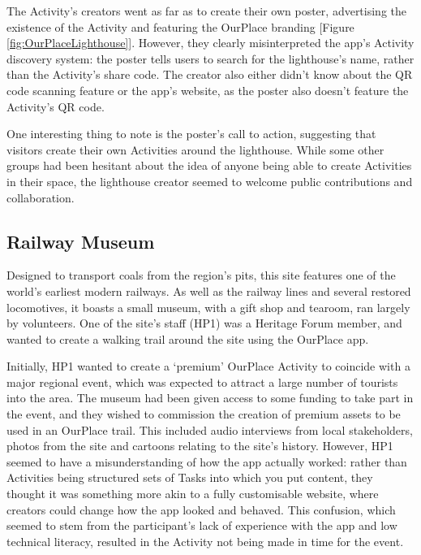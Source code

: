 The Activity's creators went as far as to create their own poster, advertising the existence of the Activity and featuring the OurPlace branding [Figure \ref{fig:OurPlaceLighthouse}]. However, they clearly misinterpreted the app's Activity discovery system: the poster tells users to search for the lighthouse's name, rather than the Activity's share code. The creator also either didn't know about the QR code scanning feature or the app's website, as the poster also doesn't feature the Activity's QR code. 

One interesting thing to note is the poster's call to action, suggesting that visitors create their own Activities around the lighthouse. While some other groups had been hesitant about the idea of anyone being able to create Activities in their space, the lighthouse creator seemed to welcome public contributions and collaboration.

\subsection{Railway Museum}

Designed to transport coals from the region's pits, this site features one of the world's earliest modern railways. As well as the railway lines and several restored locomotives, it boasts a small museum, with a gift shop and tearoom, ran largely by volunteers. One of the site's staff (HP1) was a Heritage Forum member, and wanted to create a walking trail around the site using the OurPlace app.

Initially, HP1 wanted to create a `premium' OurPlace Activity to coincide with a major regional event, which was expected to attract a large number of tourists into the area. The museum had been given access to some funding to take part in the event, and they wished to commission the creation of premium assets to be used in an OurPlace trail. This included audio interviews from local stakeholders, photos from the site and cartoons relating to the site's history. However, HP1 seemed to have a misunderstanding of how the app actually worked: rather than Activities being structured sets of Tasks into which you put content, they thought it was something more akin to a fully customisable website, where creators could change how the app looked and behaved. This confusion, which seemed to stem from the participant's lack of experience with the app and low technical literacy, resulted in the Activity not being made in time for the event.

